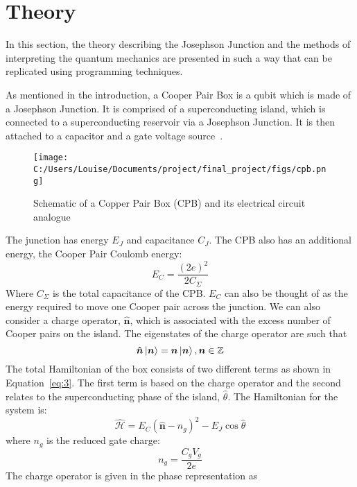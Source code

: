 \documentclass[11pt]{article}
\newcommand*{\hatH}{\hat{\mathcal{H}}}
\begin{document}
\section{Theory}
In this section, the theory describing the Josephson Junction and the methods of interpreting the quantum mechanics are presented in such a way that can be replicated using programming techniques.

As mentioned in the introduction, a Cooper Pair Box is a qubit which is made of a Josephson Junction. It is comprised of a superconducting island, which is connected to a superconducting reservoir via a Josephson Junction. It is then attached to a capacitor and a gate voltage source~\cite{cottetImplementationQuantumBit2002}.
\begin{figure}[ht]
\centering
\texttt{[image: C:/Users/Louise/Documents/project/final\_project/figs/cpb.png]}
\caption{Schematic of a Copper Pair Box (CPB) and its electrical circuit analogue}
\label{fig:picture4}
\end{figure}
The junction has energy $E_J$ and capacitance $C_J$. The CPB also has an additional energy, the Cooper Pair Coulomb energy:
\begin{equation} \label{eq:1}
E_C = \frac{(2e)^2}{2C_\Sigma}
\end{equation}
Where $C_\Sigma$ is the total capacitance of the CPB. $E_C$ can also be thought of as the energy required to move one Cooper pair across the junction. We can also consider a charge operator, $\boldsymbol{\hat{n}}$, which is associated with the excess number of Cooper pairs on the island. The eigenstates of the charge operator are such that
\begin{equation} \label{eq:2}
\boldsymbol{\hat{n}}\ket{\boldsymbol{n}} = \boldsymbol{n}\ket{\boldsymbol{n}}, \boldsymbol{n} \in \mathbb{Z}
\end{equation}
The total Hamiltonian of the box consists of two different terms as shown in Equation~\ref{eq:3}. The first term is based on the charge operator and the second relates to the superconducting phase of the island, $\hat{\theta}$. The Hamiltonian for the system is:
\begin{equation} \label{eq:3}
\hatH = E_C (\boldsymbol{\hat{n}} - n_g)^2 - E_J \cos{\hat{\theta}}
\end{equation}
where $n_g$ is the reduced gate charge:
\begin{equation} \label{eq:4}
n_g = \frac{C_g V_g}{2e}
\end{equation}
The charge operator is given in the phase representation as
\end{document}
